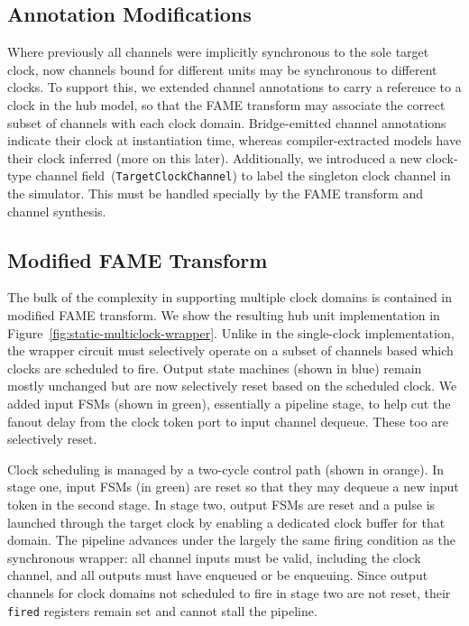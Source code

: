 \subsection{Annotation Modifications}

Where previously all channels were implicitly synchronous to the sole target
clock, now channels bound for different units may be synchronous to different
clocks. To support this, we extended channel annotations to carry a reference
to a clock in the hub model, so that the FAME transform may associate the
correct subset of channels with each clock domain. Bridge-emitted channel
annotations indicate their clock at instantiation time,
whereas compiler-extracted models have their clock inferred (more on this
later). Additionally, we introduced a new clock-type channel
field~(\texttt{TargetClockChannel}) to label the singleton clock channel in the
simulator. This must be handled specially by the FAME transform and channel
synthesis.

\subsection{Modified FAME Transform}
The bulk of the complexity in supporting multiple clock domains is contained in
modified FAME transform. We show the resulting hub unit implementation in
Figure~\ref{fig:static-multiclock-wrapper}. Unlike in the single-clock
implementation, the wrapper circuit must selectively operate on a subset of
channels based which clocks are scheduled to fire.  Output state machines (shown in
blue) remain mostly unchanged but are now selectively reset based on the
scheduled clock.  We added input FSMs (shown in green), essentially a pipeline stage, to help cut the fanout delay from
the clock token port to input channel dequeue. These too are selectively reset.

Clock scheduling is managed by a two-cycle control path (shown in orange). In
stage one, input FSMs (in green) are reset so that they may dequeue a new input
token in the second stage. In stage two, output FSMs are reset and a
pulse is launched through the target clock by enabling a dedicated clock buffer for that
domain. The pipeline advances under the largely the same firing condition as the
synchronous wrapper: all channel inputs must be valid, including the clock channel, and all outputs must have
enqueued or be enqueuing. Since output channels for clock domains not scheduled to fire in
stage two are not reset, their \texttt{fired} registers remain set and cannot stall the pipeline.

